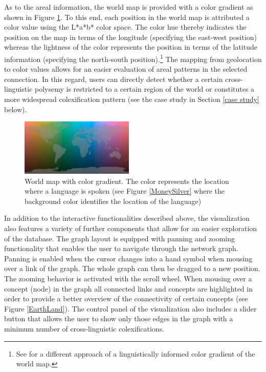 As to the areal information, the world map is provided with a color gradient as shown in Figure \ref{World map}. To this end, each position in the world map is attributed a color value using the L*a*b* color space. The color hue thereby indicates the position on the map in terms of the longitude (specifying the east-west position) whereas the lightness of the color represents the position in terms of the latitude information (specifying the north-south position).\footnote{See  for a different approach of a linguistically informed color gradient of the world map.}
The mapping from geolocation to color values allows for an easier evaluation of areal patterns in the selected connection. In this regard, users can directly detect whether a certain cross-linguistic polysemy is restricted to a certain region of the world or constitutes a more widespread colexification pattern (see the case study in Section \ref{case study} below).

\begin{figure}[htbp]
\begin{center}
\includegraphics[width=0.48\textwidth]{img/ColorScaleWorld.png}
\caption{World map with color gradient. The color represents the location where a language is spoken (see Figure \ref{MoneySilver} where the background color identifies the location of the language)
}
\label{World map}
\end{center}
\end{figure}



In addition to the interactive functionalities described above, the visualization also features a variety of further components that allow for an easier exploration of the database. The graph layout is equipped with panning and zooming functionality that enables the user to navigate through the network graph. Panning is enabled when the cursor changes into a hand symbol when mousing over a link of the graph. The whole graph can then be dragged to a new position. The zooming behavior is activated with the scroll wheel. 
When mousing over a concept (node) in the graph all connected links and concepts are highlighted
in order to provide a better overview of the connectivity of certain concepts (see Figure \ref{EarthLand}). The control panel of the visualization also includes a slider button that allows the user to show only those edges in the graph with a minimum number of cross-linguistic colexifications. 

